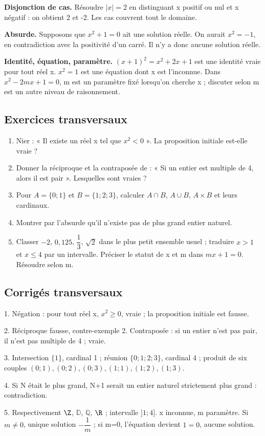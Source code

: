 \textbf{Disjonction de cas.} Résoudre $|x|=2$ en distinguant x positif ou nul et x négatif : on obtient 2 et -2. Les cas couvrent tout le domaine.\par
\textbf{Absurde.} Supposons que $x^2+1=0$ ait une solution réelle. On aurait $x^2=-1$, en contradiction avec la positivité d’un carré. Il n’y a donc aucune solution réelle.\par
\textbf{Identité, équation, paramètre.} $(x+1)^2=x^2+2x+1$ est une identité vraie pour tout réel x. $x^2=1$ est une équation dont x est l’inconnue. Dans $x^2-2mx+1=0$, m est un paramètre fixé lorsqu’on cherche x ; discuter selon m est un autre niveau de raisonnement.

\subsection*{Exercices transversaux}\label{LOG-EX}
\begin{enumerate}
\item Nier : « Il existe un réel x tel que $x^2<0$ ». La proposition initiale est-elle vraie ?
\item Donner la réciproque et la contraposée de : « Si un entier est multiple de 4, alors il est pair ». Lesquelles sont vraies ?
\item Pour $A=\{0;1\}$ et $B=\{1;2;3\}$, calculer $A\cap B$, $A\cup B$, $A\times B$ et leurs cardinaux.
\item Montrer par l’absurde qu’il n’existe pas de plus grand entier naturel.
\item Classer $-2$, $0{,}125$, $\dfrac{1}{3}$, $\sqrt2$ dans le plus petit ensemble usuel ; traduire $x>1$ et $x\leq4$ par un intervalle. Préciser le statut de x et m dans $mx+1=0$. Résoudre selon m.
\end{enumerate}
\ifprof
\subsection*{Corrigés transversaux}
1. Négation : pour tout réel x, $x^2\geq0$, vraie ; la proposition initiale est fausse.\par
2. Réciproque fausse, contre-exemple 2. Contraposée : si un entier n’est pas pair, il n’est pas multiple de 4 ; vraie.\par
3. Intersection $\{1\}$, cardinal 1 ; réunion $\{0;1;2;3\}$, cardinal 4 ; produit de six couples $(0;1),(0;2),(0;3),(1;1),(1;2),(1;3)$.\par
4. Si N était le plus grand, N+1 serait un entier naturel strictement plus grand : contradiction.\par
5. Respectivement $\Z$, $\mathbb D$, $\mathbb Q$, $\R$ ; intervalle $]1;4]$. x inconnue, m paramètre. Si $m\ne0$, unique solution $-\dfrac{1}{m}$ ; si m=0, l’équation devient $1=0$, aucune solution.
\fi

